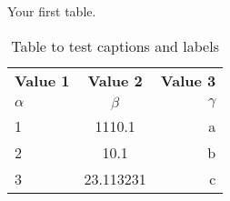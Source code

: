 
\begin{table}[h!]
\begin{center}
\caption{Your first table.}
\label{tab:table1}
\begin{tabular}{l|c|r} %
\textbf{Value 1} & \textbf{Value 2} & \textbf{Value 3}\\
$\alpha$ & $\beta$ & $\gamma$ \\
\hline
1 & 1110.1 & a\\
2 & 10.1 & b\\
3 & 23.113231 & c\\
\end{tabular}
\end{center}
\caption{Table to test captions and labels}
\label{tab:tab001}
\end{table}